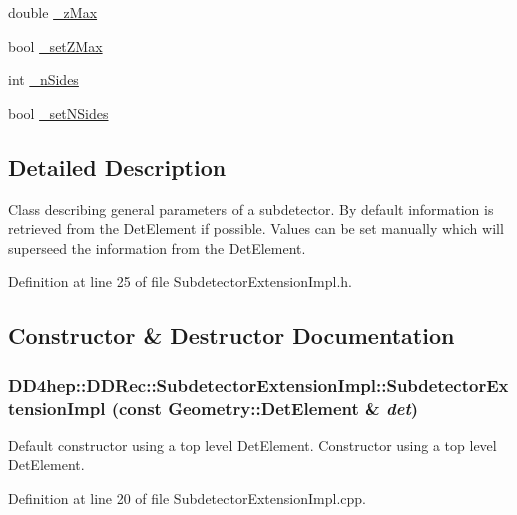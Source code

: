\begin{DoxyCompactItemize}
\item 
double \hyperlink{class_d_d4hep_1_1_d_d_rec_1_1_subdetector_extension_impl_aa8e755cc627d81013fb4e3501fdbe172}{\_\-zMax}
\item 
bool \hyperlink{class_d_d4hep_1_1_d_d_rec_1_1_subdetector_extension_impl_a6e86e2a12196aff1d36c2b79146c9a1b}{\_\-setZMax}
\item 
int \hyperlink{class_d_d4hep_1_1_d_d_rec_1_1_subdetector_extension_impl_a5f3f5b1a0cc55c564536556accc0579a}{\_\-nSides}
\item 
bool \hyperlink{class_d_d4hep_1_1_d_d_rec_1_1_subdetector_extension_impl_a1a8b0613327d2cac9e1783fcf7f22be9}{\_\-setNSides}
\end{DoxyCompactItemize}


\subsection{Detailed Description}
Class describing general parameters of a subdetector. By default information is retrieved from the DetElement if possible. Values can be set manually which will superseed the information from the DetElement. 

Definition at line 25 of file SubdetectorExtensionImpl.h.

\subsection{Constructor \& Destructor Documentation}
\hypertarget{class_d_d4hep_1_1_d_d_rec_1_1_subdetector_extension_impl_aa87c1c247120d64f47319b314c1e9981}{
\subsubsection[{SubdetectorExtensionImpl}]{\setlength{\rightskip}{0pt plus 5cm}DD4hep::DDRec::SubdetectorExtensionImpl::SubdetectorExtensionImpl (const {\bf Geometry::DetElement} \& {\em det})}}
\label{class_d_d4hep_1_1_d_d_rec_1_1_subdetector_extension_impl_aa87c1c247120d64f47319b314c1e9981}


Default constructor using a top level DetElement. Constructor using a top level DetElement. 

Definition at line 20 of file SubdetectorExtensionImpl.cpp.

